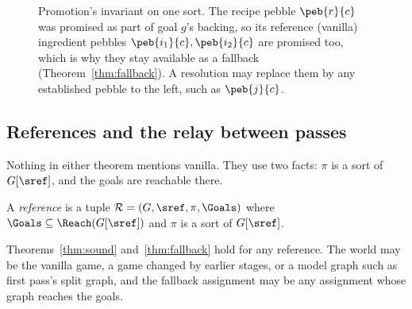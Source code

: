 \begin{figure}[t]
\centering
{}
\caption{Promotion's invariant on one sort. The recipe pebble $\peb{r}{c}$ was promised as part of goal $g$'s backing, so its reference (vanilla) ingredient pebbles $\peb{i_1}{c},\peb{i_2}{c}$ are promised too, which is why they stay available as a fallback (Theorem~\ref{thm:fallback}). A resolution may replace them by any established pebble to the left, such as $\peb{j}{c}$.}
\label{fig:rankline}
\end{figure}

\subsection{References and the relay between passes}

Nothing in either theorem mentions vanilla. They use two facts: $\pi$ is a sort of $G[\sref]$, and the goals are reachable there.

\begin{definition}[Reference]\label{def:reference}
A \emph{reference} is a tuple $\mathcal{R}=(G,\sref,\pi,\Goals)$ where $\Goals\subseteq\Reach(G[\sref])$ and $\pi$ is a sort of $G[\sref]$.
\end{definition}

\begin{corollary}\label{cor:reference}
Theorems~\ref{thm:sound} and~\ref{thm:fallback} hold for any reference. The world may be the vanilla game, a game changed by earlier stages, or a model graph such as first pass's split graph, and the fallback assignment may be any assignment whose graph reaches the goals.
\end{corollary}

